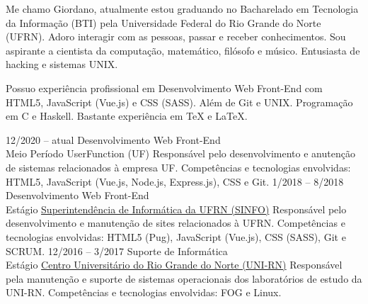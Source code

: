 \documentclass[9pt]{developercv}
\begin{document}
	\maketitle

	\begin{minipage}[t]{1\textwidth}
		Me chamo Giordano, atualmente estou gradu\-ando no Bacharelado em Tecnologia da Informação (BTI) pela Universidade Federal do Rio Grande do Norte (UFRN).
		Adoro interagir com as pessoas, passar e receber conhecimentos. Sou aspirante a cientista da computação, matemático, filósofo e músico. Entusiasta de hacking e sistemas UNIX. 
	\end{minipage}
	
	\begin{minipage}[t]{1\textwidth}
		Possuo experiência profissional em Desenvolvimento Web Front-End com HTML5, JavaScript (Vue.js) e CSS (SASS). Além de Git e UNIX. Programação em C e Haskell. Bastante experiência em \TeX{} e \LaTeX{}.
	\end{minipage}


	\begin{entrylist}
		\entry
			{12/2020 -- atual}
			{Desenvolvimento Web Front-End\\
				\footnotesize{Meio Período}}
			{UserFunction (UF)}
			{Responsável pelo desenvolvimento e anutenção de sistemas relacionados à empresa UF.
                Competências e tecnologias envolvidas: HTML5, JavaScript (Vue.js, Node.js, Express.js), CSS e Git.}
		\entry
			{1/2018 -- 8/2018}
			{Desenvolvimento Web Front-End\\
				\footnotesize{Estágio}}
			{\href{https://www.info.ufrn.br/}{Superintendência de Informática da UFRN (SINFO)}}
			{Responsável pelo desenvolvimento e manutenção de sites relacionados à UFRN.
				Competências e tecnologias envolvidas: HTML5 (Pug), JavaScript (Vue.js), CSS (SASS), Git e SCRUM.}
		\entry
			{12/2016 -- 3/2017}
			{Suporte de Informática\\
				\footnotesize{Estágio}}
			{\href{http://unirn.edu.br/}{Centro Universitário do Rio Grande do Norte (UNI-RN)}}
			{Responsável pela manutenção e suporte de sistemas operacionais dos laboratórios de estudo da UNI-RN.
				Competências e tecnologias envolvidas: FOG e Linux.}
	\end{entrylist}
\end{document}
